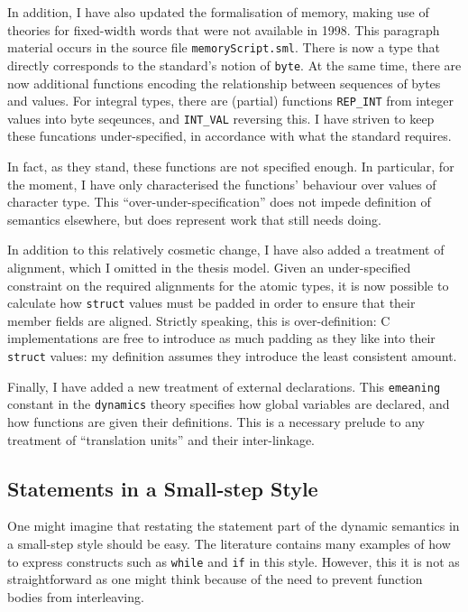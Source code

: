 \documentclass[11pt]{article}
\begin{document}
In addition, I have also updated the formalisation of memory, making
use of theories for fixed-width words that were not available in 1998.
This paragraph material occurs in the source file
\texttt{memoryScript.sml}. There is now a type that directly
corresponds to the standard's notion of \texttt{byte}.  At the same
time, there are now additional functions encoding the relationship
between sequences of bytes and values.  For integral types, there are
(partial) functions \texttt{REP\_INT} from integer values into byte
seqeunces, and \texttt{INT\_VAL} reversing this.  I have striven to
keep these funcations under-specified, in accordance with what the
standard requires.

In fact, as they stand, these functions are not specified enough.  In
particular, for the moment, I have only characterised the functions'
behaviour over values of character type.  This
``over-under-specification'' does not impede definition of semantics
elsewhere, but does represent work that still needs doing.

In addition to this relatively cosmetic change, I have also added a
treatment of alignment, which I omitted in the thesis model.  Given an
under-specified constraint on the required alignments for the atomic
types, it is now possible to calculate how \texttt{struct} values must
be padded in order to ensure that their member fields are aligned.
Strictly speaking, this is over-definition: C implementations are free
to introduce as much padding as they like into their \texttt{struct}
values: my definition assumes they introduce the least consistent
amount.

Finally, I have added a new treatment of external declarations.  This
\texttt{emeaning} constant in the \texttt{dynamics} theory specifies
how global variables are declared, and how functions are given their
definitions.  This is a necessary prelude to any treatment of
``translation units'' and their inter-linkage.

\subsection{Statements in a Small-step Style}
\label{sec:small-step-stmts}

One might imagine that restating the statement part of the dynamic
semantics in a small-step style should be easy.  The literature
contains many examples of how to express constructs such as
\texttt{while} and \texttt{if} in this style.  However, this it is not
as straightforward as one might think because of the need to prevent
function bodies from interleaving.
\end{document}
